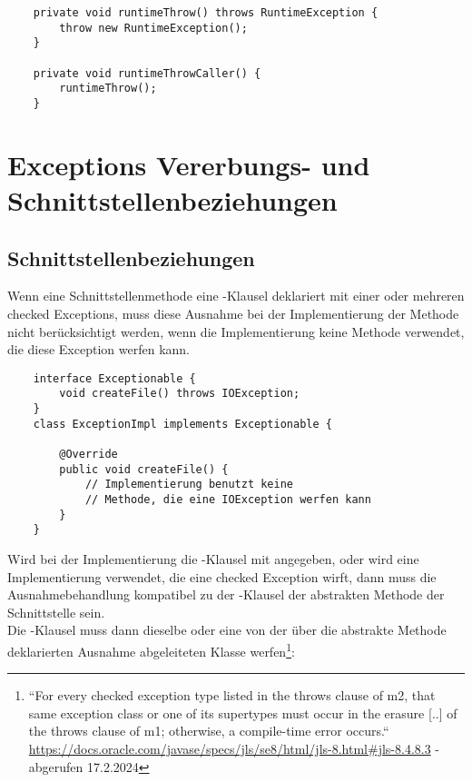 \begin{verbatim}
    private void runtimeThrow() throws RuntimeException {
        throw new RuntimeException();
    }

    private void runtimeThrowCaller() {
        runtimeThrow();
    }
\end{verbatim}

\section{Exceptions Vererbungs- und Schnittstellenbeziehungen}

\subsection{Schnittstellenbeziehungen}
Wenn eine Schnittstellenmethode eine -Klausel deklariert mit einer oder mehreren checked Exceptions, muss diese Ausnahme bei der Implementierung der Methode nicht berücksichtigt werden, wenn die Implementierung keine Methode verwendet, die diese Exception werfen kann.\\

\noindent
\begin{verbatim}
    interface Exceptionable {
        void createFile() throws IOException;
    }
    class ExceptionImpl implements Exceptionable {

        @Override
        public void createFile() {
            // Implementierung benutzt keine
            // Methode, die eine IOException werfen kann
        }
    }
\end{verbatim}

\noindent
Wird bei der Implementierung die -Klausel mit angegeben, oder wird eine Implementierung verwendet, die eine checked Exception wirft, dann muss die Ausnahmebehandlung kompatibel zu der -Klausel der abstrakten Methode der Schnittstelle sein.\\
Die -Klausel muss dann dieselbe oder eine von der über die abstrakte Methode deklarierten Ausnahme abgeleiteten Klasse werfen\footnote{
    ``For every checked exception type listed in the throws clause of m2, that same exception class or one of its supertypes must occur in the erasure [..] of the throws clause of m1; otherwise, a compile-time error occurs.`` \url{https://docs.oracle.com/javase/specs/jls/se8/html/jls-8.html#jls-8.4.8.3} - abgerufen 17.2.2024
}:

